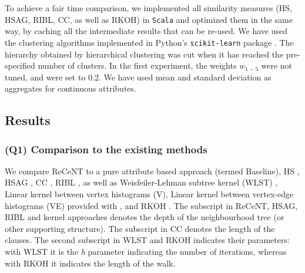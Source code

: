 To achieve a fair time comparison, we implemented all similarity measures (HS, HSAG, RIBL, CC, as well as RKOH) in \texttt{Scala} and optimized them in the same way, by caching all the intermediate results that can be re-used.
We have used the clustering algorithms implemented in Python's \texttt{scikit-learn} package \cite{scikit-learn}.
The hierarchy obtained by hierarchical clustering was cut when it has reached the pre-specified number of clusters.  
In the first experiment, the weights $w_{1-5}$ were not tuned, and were set to 0.2.
We have used mean and standard deviation as aggregates for continuous attributes.






\subsection{Results} 
\label{sec:ResultsSub}



\subsubsection{\textbf{(Q1) Comparison to the existing methods}}

We compare ReCeNT to a pure attribute based approach (termed Baseline), HS \cite{Neville03clusteringrelational}, HSAG \cite{WitsenburgB11a}, CC \cite{Fonseca2012}, RIBL \cite{RIBL96}, as well as Weisfeiler-Lehman subtree kernel (WLST) \cite{shervashidze09fastsubtree}, Linear kernel between vertex histograms (V), Linear kernel between vertex-edge histograms (VE) provided with \cite{NIPS2015_5688}, and RKOH \cite{WachmanK07}. 
The subscript in ReCeNT, HSAG, RIBL and kernel approaches  denotes the depth of the neighbourhood tree (or other supporting structure).
The subscript in CC denotes the length of the clauses.
The second subscript in WLST and RKOH indicates their parameters: with WLST it is the \textit{h} parameter indicating the number of iterations, whereas with RKOH it indicates the length of the walk.
\vspace{2pt}


